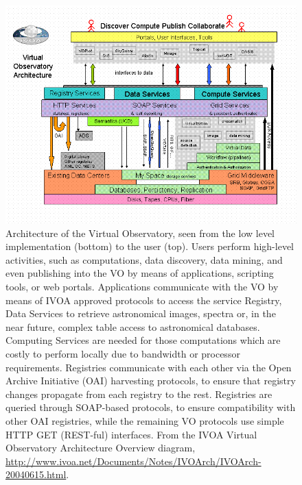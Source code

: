\newcommand{\voarchitecturenoteurl}[0]
{http://www.ivoa.net/Documents/Notes/IVOArch/IVOArch-20040615.html}
	\begin{figure}[tbp]
		\centering
			\includegraphics[width=\columnwidth]
			{fig/VO_Architecture.png}
		\caption[Virtual Observatory architectural overview]
		{
			Architecture of the Virtual Observatory, seen from the
			low level implementation (bottom) to the user (top).
			Users perform high-level activities, such as
			computations, data discovery, data mining, and even
			publishing into the VO by means of applications,
			scripting tools, or web portals. Applications
			communicate with the VO by means of IVOA approved
			protocols to access the service Registry, Data Services
			to retrieve astronomical images, spectra or, in the
			near future, complex table access to astronomical
			databases. Computing Services are needed for those
			computations which are costly to perform locally due to
			bandwidth or processor requirements. Registries
			communicate with each other via the Open Archive
			Initiative (OAI) harvesting protocols, to ensure that
			registry changes propagate from each registry to the
			rest. Registries are queried through SOAP-based
			protocols, to ensure compatibility with other OAI
			registries, while the remaining VO protocols use simple
			HTTP GET (REST-ful) interfaces. From the IVOA Virtual
			Observatory Architecture Overview diagram,
			\url{\voarchitecturenoteurl}.
		}
		\label{fig:fig_VOArch}
	\end{figure}



